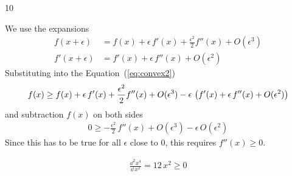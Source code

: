 \documentclass{sotonExamBoxes}    %
\begin{document}
\begin{question}{10}
\begin{qparts}
      \begin{answer}
        We use the expansions
        \begin{align*}
          f(x+\epsilon) &= f(x) + \epsilon\,f'(x) +
                          \frac{\epsilon^2}{2} f''(x) + O(\epsilon^3) \\
          f'(x+\epsilon) &= f'(x) + \epsilon\,f''(x) +
                           O(\epsilon^2) 
        \end{align*}
        Substituting into the Equation~(\ref{eq:convex2})
        \begin{align*}
          f(x) \geq f(x) + \epsilon\,f'(x) +
          \frac{\epsilon^2}{2} f''(x) + O(\epsilon^3)
          - \epsilon\,\left( f'(x) + \epsilon\,f''(x) +
                           O(\epsilon^2)  \right)
        \end{align*}
        and subtraction $f(x)$ on both sides
        \begin{align*}
          0 \geq - \frac{\epsilon^2}{2} \, f''(x) + O(\epsilon^3) - \epsilon\,O(\epsilon^2) 
        \end{align*}
        Since this has to be true for all $\epsilon$ close to $0$, this requires $f''(x)\geq0$.
      \end{answer}
      \begin{answer}
        \begin{align*}
          \frac{\dd^2 x^4}{\dd \, x^2} = 12\,x^2 \geq 0
        \end{align*}
      \end{answer}
  \end{qparts}
\end{question}
\freshpage

\end{document}
